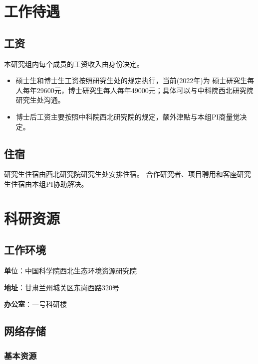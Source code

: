 \documentclass[
]{book}
\providecommand{\tightlist}{%
  \setlength{\itemsep}{0pt}\setlength{\parskip}{0pt}}
\begin{document}
\hypertarget{allowance}{%
\chapter{工作待遇}\label{allowance}}

\hypertarget{ux5de5ux8d44}{%
\section{工资}\label{ux5de5ux8d44}}

本研究组内每个成员的工资收入由身份决定。

\begin{itemize}
\tightlist
\item
  硕士生和博士生工资按照研究生处的规定执行，当前(2022年)为
  硕士研究生每人每年29600元，博士研究生每人每年49000元；具体可以与中科院西北研究院研究生处沟通。
\item
  博士后工资主要按照中科院西北研究院的规定，额外津贴与本组PI商量觉决定。
\end{itemize}

\hypertarget{ux4f4fux5bbf}{%
\section{住宿}\label{ux4f4fux5bbf}}

研究生住宿由西北研究院研究生处安排住宿。
合作研究者、项目聘用和客座研究生住宿由本组PI协助解决。

\hypertarget{res}{%
\chapter{科研资源}\label{res}}

\hypertarget{ux5de5ux4f5cux73afux5883}{%
\section{工作环境}\label{ux5de5ux4f5cux73afux5883}}

\textbf{单}位：中国科学院西北生态环境资源研究院

\textbf{地址}：甘肃兰州城关区东岗西路320号

\textbf{办公室}：一号科研楼

\hypertarget{ux7f51ux7edcux5b58ux50a8}{%
\section{网络存储}\label{ux7f51ux7edcux5b58ux50a8}}

\hypertarget{ux57faux672cux8d44ux6e90}{%
\subsection{基本资源}\label{ux57faux672cux8d44ux6e90}}
\end{document}
